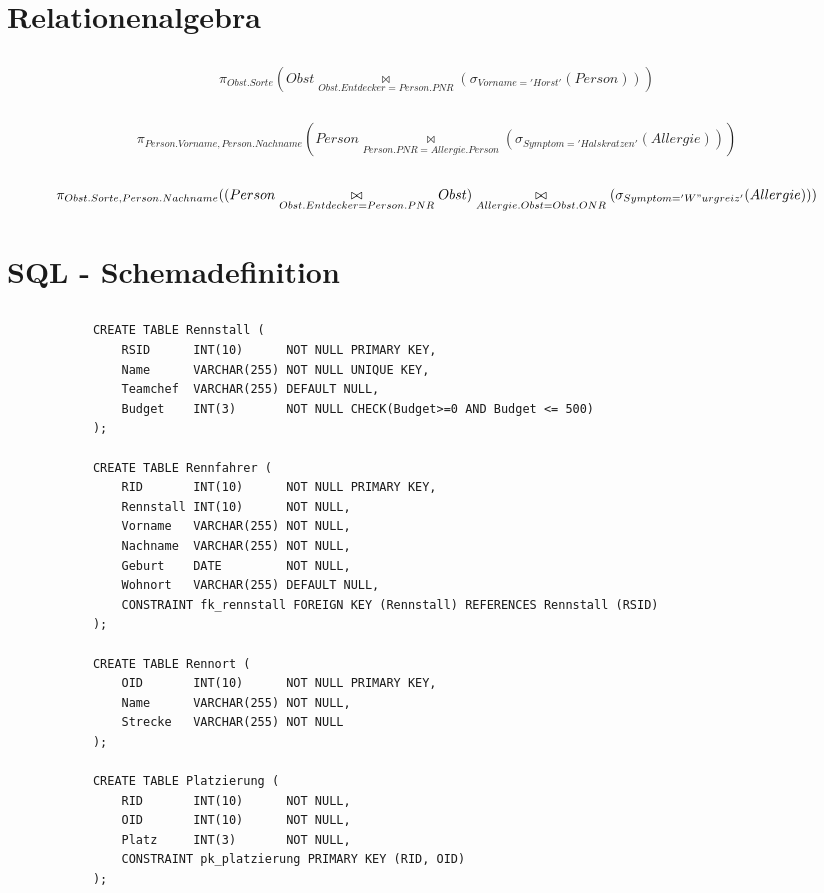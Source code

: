 \documentclass[ngerman]{gdb-aufgabenblatt}
\begin{document}
\section{Relationenalgebra}
	\subsection{} %
		\[
			\pi_{Obst.Sorte}(Obst \underset{Obst.Entdecker=Person.PNR}{\bowtie}( \sigma_{Vorname='Horst'}(Person)))
		\]
	\subsection{} %
		\[
			\pi_{Person.Vorname, Person.Nachname}(Person \underset{Person.PNR=Allergie.Person}{\bowtie} (\sigma_{Symptom='Halskratzen'}(Allergie)))
		\]
	\subsection{} %
		\[
			\pi_{Obst.Sorte, Person.Nachname}((Person \underset{Obst.Entdecker=Person.PNR}{\bowtie} Obst) \underset{Allergie.Obst=Obst.ONR}{\bowtie} (\sigma_{Symptom='W"urgreiz'}(Allergie)))
		\]
		
\section{SQL - Schemadefinition}
	\subsection{} %
		\begin{verbatim}
		    CREATE TABLE Rennstall (
		        RSID      INT(10)      NOT NULL PRIMARY KEY,
		        Name      VARCHAR(255) NOT NULL UNIQUE KEY,
		        Teamchef  VARCHAR(255) DEFAULT NULL,
		        Budget    INT(3)       NOT NULL CHECK(Budget>=0 AND Budget <= 500)
		    );
		    
		    CREATE TABLE Rennfahrer (
		        RID       INT(10)      NOT NULL PRIMARY KEY,
		        Rennstall INT(10)      NOT NULL,
		        Vorname   VARCHAR(255) NOT NULL,
		        Nachname  VARCHAR(255) NOT NULL,
		        Geburt    DATE         NOT NULL,
		        Wohnort   VARCHAR(255) DEFAULT NULL,
		        CONSTRAINT fk_rennstall FOREIGN KEY (Rennstall) REFERENCES Rennstall (RSID)
		    );
		    
		    CREATE TABLE Rennort (
		        OID       INT(10)      NOT NULL PRIMARY KEY,
		        Name      VARCHAR(255) NOT NULL,
		        Strecke   VARCHAR(255) NOT NULL
		    );
		    
		    CREATE TABLE Platzierung (
		        RID       INT(10)      NOT NULL,
		        OID       INT(10)      NOT NULL,
		        Platz     INT(3)       NOT NULL,
		        CONSTRAINT pk_platzierung PRIMARY KEY (RID, OID)
		    );
		\end{verbatim}
\end{document}
